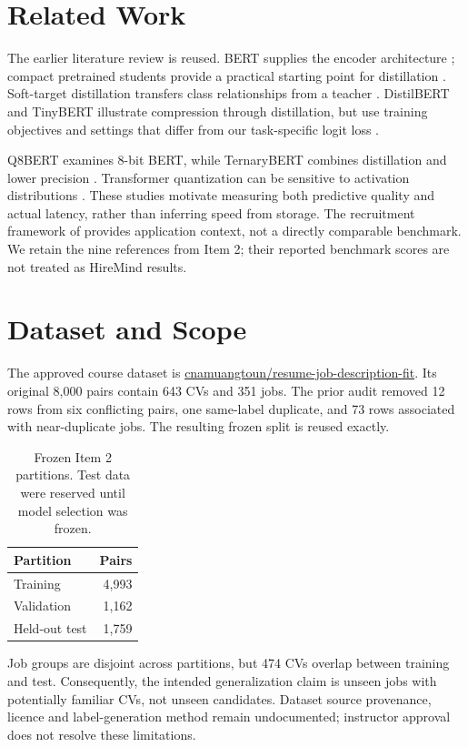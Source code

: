\documentclass[11pt]{article}
\begin{document}
\section{Related Work}
The earlier literature review is reused. BERT supplies the encoder architecture \citep{bert}; compact pretrained students provide a practical starting point for distillation \citep{turc}. Soft-target distillation transfers class relationships from a teacher \citep{hinton}. DistilBERT and TinyBERT illustrate compression through distillation, but use training objectives and settings that differ from our task-specific logit loss \citep{distilbert,tinybert}.

Q8BERT examines 8-bit BERT, while TernaryBERT combines distillation and lower precision \citep{q8,ternary}. Transformer quantization can be sensitive to activation distributions \citep{bondarenko}. These studies motivate measuring both predictive quality and actual latency, rather than inferring speed from storage. The recruitment framework of \citet{gan} provides application context, not a directly comparable benchmark. We retain the nine references from Item 2; their reported benchmark scores are not treated as HireMind results.

\section{Dataset and Scope}
The approved course dataset is \url{cnamuangtoun/resume-job-description-fit}. Its original 8,000 pairs contain 643 CVs and 351 jobs. The prior audit removed 12 rows from six conflicting pairs, one same-label duplicate, and 73 rows associated with near-duplicate jobs. The resulting frozen split is reused exactly.
\begin{table}[h]\centering\small
\begin{tabular}{lr}\toprule Partition & Pairs\\\midrule Training & 4,993\\Validation & 1,162\\Held-out test & 1,759\\\bottomrule\end{tabular}
\caption{Frozen Item 2 partitions. Test data were reserved until model selection was frozen.}\end{table}
Job groups are disjoint across partitions, but 474 CVs overlap between training and test. Consequently, the intended generalization claim is unseen jobs with potentially familiar CVs, not unseen candidates. Dataset source provenance, licence and label-generation method remain undocumented; instructor approval does not resolve these limitations.
\end{document}
